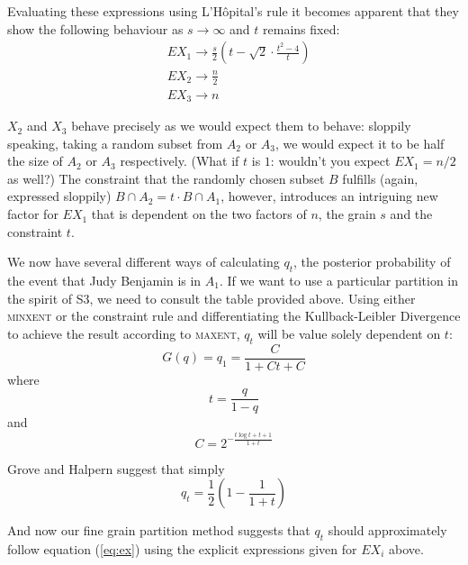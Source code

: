 \documentclass[11pt]{article}
\begin{document}
Evaluating these expressions using L'H{\^o}pital's rule it becomes
apparent that they show the following behaviour as
$s\rightarrow\infty$ and $t$ remains fixed:
\begin{align}
  &EX_{1}\rightarrow\frac{s}{2}\left(t-\sqrt{2}\cdot\frac{t^{2}-4}{t}\right) \\
  &EX_{2}\rightarrow{}\frac{n}{2} \\
  &EX_{3}\rightarrow{}n
\end{align}

$X_{2}$ and $X_{3}$ behave precisely as we would expect them to
behave: sloppily speaking, taking a random subset from $A_{2}$ or
$A_{3}$, we would expect it to be half the size of $A_{2}$ or $A_{3}$
respectively. (What if $t$ is $1$: wouldn't you expect $EX_{1}=n/2$ as
well?) The constraint that the randomly chosen subset $B$ fulfills
(again, expressed sloppily) $B\cap{}A_{2}=t\cdot{}B\cap{}A_{1}$,
however, introduces an intriguing new factor for $EX_{1}$ that is
dependent on the two factors of $n$, the grain $s$ and the constraint
$t$.

We now have several different ways of calculating $q_{t}$, the
posterior probability of the event that Judy Benjamin is in $A_{1}$.
If we want to use a particular partition in the spirit of S3, we need
to consult the table provided above. Using either \textsc{minxent} or
the constraint rule and differentiating the Kullback-Leibler
Divergence to achieve the result according to \textsc{maxent}, $q_{t}$
will be value solely dependent on $t$:
\begin{equation}
  \label{eq:fromq1toq}
  G(q)=q_{1}=\frac{C}{1+Ct+C}
\end{equation}
where
\begin{equation*}
  t=\frac{q}{1-q}
\end{equation*}
and
\begin{equation*}
  C=2^{-\frac{t\log{}t+t+1}{1+t}}
\end{equation*}

Grove and Halpern suggest that simply
\begin{equation}
  q_{t}=\frac{1}{2}\left(1-\frac{1}{1+t}\right)
\end{equation}

And now our fine grain partition method suggests that $q_{t}$ should
approximately follow equation ({\ref{eq:ex}}) using the explicit
expressions given for $EX_{i}$ above.







\end{document}
